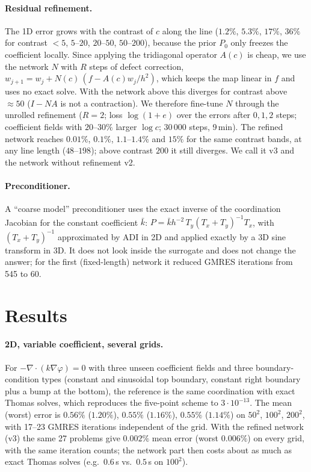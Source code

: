 \documentclass[11pt]{article}
\begin{document}
\paragraph{Residual refinement.}
The 1D error grows with the contrast of $c$ along the line ($1.2\%$, $5.3\%$, $17\%$, $36\%$ for contrast
$<5$, $5$--$20$, $20$--$50$, $50$--$200$), because the prior $P_0$ only freezes the coefficient locally.
Since applying the tridiagonal operator $A(c)$ is cheap, we use the network $N$ with $R$ steps of defect
correction, $w_{j+1} = w_j + N(c)\,(f - A(c)w_j/h^2)$, which keeps the map linear in $f$ and uses no exact
solve. With the network above this diverges for contrast above $\approx 50$ ($I-NA$ is not a contraction).
We therefore fine-tune $N$ through the unrolled refinement ($R=2$; loss $\log(1+e)$ over the errors after
$0,1,2$ steps; coefficient fields with $20$--$30\%$ larger $\log c$; 30\,000 steps, 9\,min). The refined
network reaches $0.01\%$, $0.1\%$, $1.1$--$1.4\%$ and $15\%$ for the same contrast bands, at any line length
($48$--$198$); above contrast $200$ it still diverges. We call it v3 and the network without refinement v2.

\paragraph{Preconditioner.}
A ``coarse model'' preconditioner uses the exact inverse of the coordination Jacobian for the
constant coefficient $\bar k$: $P = \bar k h^{-2}\, T_y (T_x+T_y)^{-1} T_x$, with $(T_x+T_y)^{-1}$
approximated by ADI in 2D and applied exactly by a 3D sine transform in 3D. It does not look inside the
surrogate and does not change the answer; for the first (fixed-length) network it reduced GMRES
iterations from 545 to 60.

\section{Results}

\paragraph{2D, variable coefficient, several grids.}
For $-\nabla\cdot(k\nabla\varphi)=0$ with three unseen coefficient fields and three boundary-condition
types (constant and sinusoidal top boundary, constant right boundary plus a bump at the bottom), the
reference is the same coordination with exact Thomas solves, which reproduces the five-point scheme to
$3\cdot10^{-13}$. The mean (worst) error is $0.56\%$ ($1.20\%$), $0.55\%$ ($1.16\%$), $0.55\%$ ($1.14\%$) on
$50^2$, $100^2$, $200^2$, with 17--23 GMRES iterations independent of the grid. With the refined network
(v3) the same 27 problems give $0.002\%$ mean error (worst $0.006\%$) on every grid, with the same iteration counts; the network part
then costs about as much as exact Thomas solves (e.g.\ $0.6$\,s vs.\ $0.5$\,s on $100^2$).
\end{document}
